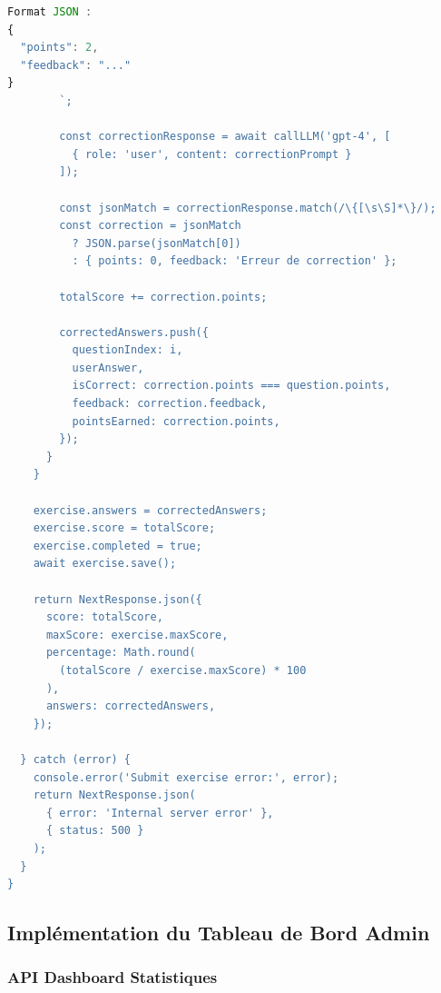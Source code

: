\begin{lstlisting}[language=JavaScript, caption=API Route pour corriger les exercices, label=code:api-correct]
Format JSON :
{
  "points": 2,
  "feedback": "..."
}
        `;

        const correctionResponse = await callLLM('gpt-4', [
          { role: 'user', content: correctionPrompt }
        ]);

        const jsonMatch = correctionResponse.match(/\{[\s\S]*\}/);
        const correction = jsonMatch 
          ? JSON.parse(jsonMatch[0]) 
          : { points: 0, feedback: 'Erreur de correction' };

        totalScore += correction.points;

        correctedAnswers.push({
          questionIndex: i,
          userAnswer,
          isCorrect: correction.points === question.points,
          feedback: correction.feedback,
          pointsEarned: correction.points,
        });
      }
    }

    exercise.answers = correctedAnswers;
    exercise.score = totalScore;
    exercise.completed = true;
    await exercise.save();

    return NextResponse.json({
      score: totalScore,
      maxScore: exercise.maxScore,
      percentage: Math.round(
        (totalScore / exercise.maxScore) * 100
      ),
      answers: correctedAnswers,
    });

  } catch (error) {
    console.error('Submit exercise error:', error);
    return NextResponse.json(
      { error: 'Internal server error' },
      { status: 500 }
    );
  }
}
\end{lstlisting}

\subsection{Implémentation du Tableau de Bord Admin}

\subsubsection{API Dashboard Statistiques}

